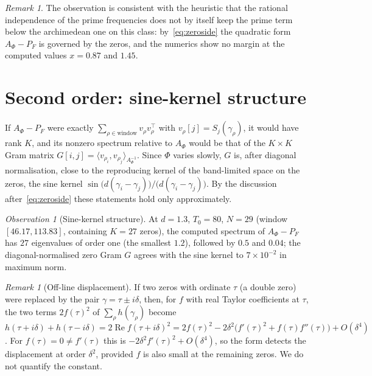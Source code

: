 \documentclass[11pt]{amsart}
\theoremstyle{definition}
\theoremstyle{remark}
\newtheorem{remark}[theorem]{Remark}
\newtheorem{observation}[theorem]{Observation}
\newcommand{\re}{\operatorname{Re}}
\newcommand{\Aphi}{A_\Phi}
\newcommand{\Pf}{P_F}
\begin{document}
\begin{remark}
The observation is consistent with the heuristic that the rational independence of the prime frequencies does
not by itself keep the prime term below the archimedean one on this class: by~\eqref{eq:zeroside} the
quadratic form $\Aphi-\Pf$ is governed by the zeros, and the numerics show no margin at the computed values $x=0.87$ and $1.45$.
\end{remark}

\section{Second order: sine-kernel structure}\label{sec:second}

If $\Aphi-\Pf$ were exactly $\sum_{\rho\in\text{window}}v_\rho v_\rho^{\!\top}$ with $v_\rho[j]=S_j(\gamma_\rho)$,
it would have rank $K$, and its nonzero spectrum relative to $\Aphi$ would be that of the $K\times K$ Gram
matrix $G[i,j]=\langle v_{\rho_i},v_{\rho_j}\rangle_{\Aphi^{-1}}$. Since $\Phi$ varies slowly, $G$ is, after
diagonal normalisation, close to the reproducing kernel of the band-limited space on the zeros, the sine kernel
$\sin\!\big(d(\gamma_i-\gamma_j)\big)/\big(d(\gamma_i-\gamma_j)\big)$. By the discussion after~\eqref{eq:zeroside}
these statements hold only approximately.

\begin{observation}[Sine-kernel structure]\label{thm:sinekernel}
At $d=1.3$, $T_0=80$, $N=29$ \textup{(}window $[46.17,113.83]$, containing $K=27$ zeros\textup{)}, the
computed spectrum of $\Aphi-\Pf$ has $27$ eigenvalues of order one \textup{(}the smallest $1.2$\textup{)},
followed by $0.5$ and $0.04$; the diagonal-normalised zero Gram $G$ agrees with the sine kernel to
$7\times10^{-2}$ in maximum norm.
\end{observation}

\begin{remark}[Off-line displacement]
If two zeros with ordinate $\tau$ (a double zero) were replaced by the pair $\gamma=\tau\pm i\delta$, then, for
$f$ with real Taylor coefficients at $\tau$, the two terms $2f(\tau)^2$ of $\sum_\rho h(\gamma_\rho)$ become
$h(\tau+i\delta)+h(\tau-i\delta)=2\re f(\tau+i\delta)^2=2f(\tau)^2-2\delta^2\big(f'(\tau)^2+f(\tau)f''(\tau)\big)+O(\delta^4)$.
For $f(\tau)=0\ne f'(\tau)$ this is $-2\delta^2f'(\tau)^2+O(\delta^4)$, so the form detects the displacement at
order $\delta^2$, provided $f$ is also small at the remaining zeros. We do not quantify the constant.
\end{remark}
\end{document}
